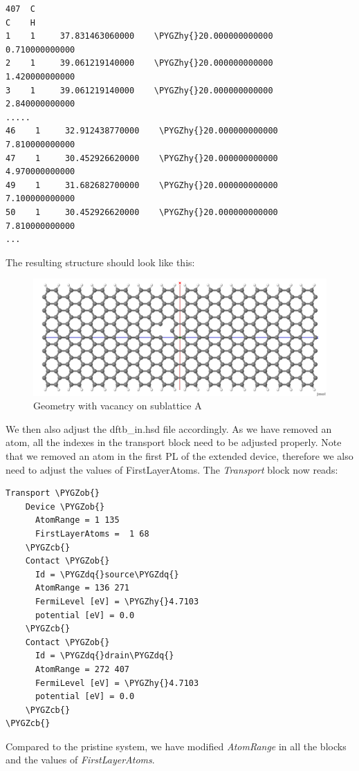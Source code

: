 \documentclass[a4paper,11pt,english]{sphinxmanual}
\def\PYGZob{\char`\{}
\def\PYGZcb{\char`\}}
\def\PYGZhy{\char`\-}
\def\PYGZdq{\char`\"}
\begin{document}
{{\begin{Verbatim}[commandchars=\\\{\}]
407  C
C    H
1    1     37.831463060000    \PYGZhy{}20.000000000000      0.710000000000
2    1     39.061219140000    \PYGZhy{}20.000000000000      1.420000000000
3    1     39.061219140000    \PYGZhy{}20.000000000000      2.840000000000
.....
46    1     32.912438770000    \PYGZhy{}20.000000000000      7.810000000000
47    1     30.452926620000    \PYGZhy{}20.000000000000      4.970000000000
49    1     31.682682700000    \PYGZhy{}20.000000000000      7.100000000000
50    1     30.452926620000    \PYGZhy{}20.000000000000      7.810000000000
...
\end{Verbatim}

The resulting structure should look like this:
\begin{figure}[htbp]
\centering
\capstart
\includegraphics[width=0.800\linewidth]{device_7_vac.png}
\caption{Geometry with vacancy on sublattice A}\end{figure}

We then also adjust the dftb\_in.hsd file accordingly. As we have
removed an atom, all the indexes in the transport block need to be
adjusted properly. Note that we removed an atom in the first PL of the
extended device, therefore we also need to adjust the values of
FirstLayerAtoms. The \emph{Transport} block now reads:

\begin{Verbatim}[commandchars=\\\{\}]
Transport \PYGZob{}
    Device \PYGZob{}
      AtomRange = 1 135
      FirstLayerAtoms =  1 68
    \PYGZcb{}
    Contact \PYGZob{}
      Id = \PYGZdq{}source\PYGZdq{}
      AtomRange = 136 271
      FermiLevel [eV] = \PYGZhy{}4.7103
      potential [eV] = 0.0
    \PYGZcb{}
    Contact \PYGZob{}
      Id = \PYGZdq{}drain\PYGZdq{}
      AtomRange = 272 407
      FermiLevel [eV] = \PYGZhy{}4.7103
      potential [eV] = 0.0
    \PYGZcb{}
\PYGZcb{}
\end{Verbatim}

Compared to the pristine system, we have modified \emph{AtomRange} in all
the blocks and the values of \emph{FirstLayerAtoms}.

}}
\end{document}
